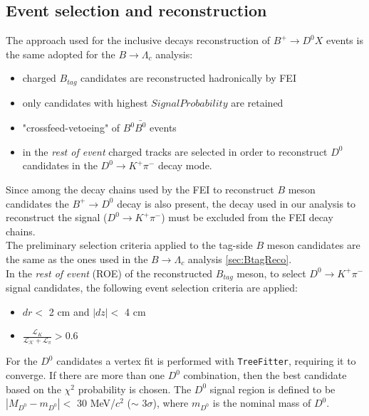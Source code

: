    \subsection{Event selection and reconstruction}
   
   The approach used for the inclusive decays reconstruction of $B^+ \rightarrow D^0 X$ events is the same adopted for the $B \rightarrow \Lambda_c$ analysis:
   \begin{itemize} 
\item charged $B_{tag}$ candidates are reconstructed hadronically by FEI
\item only candidates with highest $Signal Probability$ are retained
\item "crossfeed-vetoeing" of $B^0\bar{B^0}$ events 
\item in the \textit{rest of event} charged tracks are selected in order to reconstruct $D^0$ candidates in the  $D^0 \rightarrow K^+ \pi^-$ decay mode.
   \end{itemize} 

  Since among the decay chains used by the FEI to reconstruct  $B$ meson candidates the $B^+ \rightarrow D^0$ decay is also present,
   the decay used in our analysis to reconstruct the signal ($D^0 \rightarrow K^+ \pi^-$) must be excluded from the FEI decay chains.\\
   The preliminary selection criteria applied to the tag-side $B$ meson candidates are the same as the ones used in the $B \rightarrow \Lambda_c$ analysis \cref{sec:BtagReco}. \\
   \noindent In the \textit{rest of event} (ROE) of the reconstructed $B_{tag}$ meson, to select $D^0 \rightarrow K^+ \pi^-$ signal candidates, the following event selection criteria are applied:
   \begin{itemize}
   \item $dr <$ 2 cm and $|dz| <$ 4 cm
   \item $\frac{\mathcal{L}_{K}}{\mathcal{L_{K}}+\mathcal{L_{\pi}}} > 0.6$
   \end{itemize}
   For the $D^0 $ candidates a vertex fit is performed with \texttt{TreeFitter}, requiring it to converge.  If there are more than one $D^0$ combination, then the best candidate based on the $\chi^2$ probability is chosen. The $D^0$ signal region is defined to be $|M_{D^0}  - m_{D^0}| < $   30  MeV/$c^2$ 
   \newline \noindent ($\sim$ 3$\sigma$), where $m_{D^0 }$ is the nominal mass of $D^0$.\\

